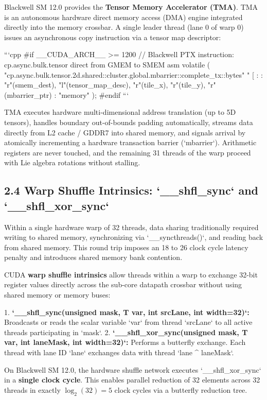 \documentclass[11pt,twoside,openright]{amsbook}
\begin{document}
{{{{{{{Blackwell SM 12.0 provides the \textbf{Tensor Memory Accelerator (TMA)}. TMA is an autonomous hardware direct memory access (DMA) engine integrated directly into the memory crossbar. A single leader thread (lane 0 of warp 0) issues an asynchronous copy instruction via a tensor map descriptor:

```cpp
#if __CUDA_ARCH__ >= 1200
// Blackwell PTX instruction: cp.async.bulk.tensor direct from GMEM to SMEM
asm volatile (
    "cp.async.bulk.tensor.2d.shared::cluster.global.mbarrier::complete_tx::bytes"
    " [%
    :
    : "r"(smem_dest), "l"(tensor_map_desc), "r"(tile_x), "r"(tile_y), "r"(mbarrier_ptr)
    : "memory"
);
#endif
```

TMA executes hardware multi-dimensional address translation (up to 5D tensors), handles boundary out-of-bounds padding automatically, streams data directly from L2 cache / GDDR7 into shared memory, and signals arrival by atomically incrementing a hardware transaction barrier (`mbarrier`). Arithmetic registers are never touched, and the remaining 31 threads of the warp proceed with Lie algebra rotations without stalling.

\subsection{2.4 Warp Shuffle Intrinsics: `__shfl_sync` and `__shfl_xor_sync`}

Within a single hardware warp of 32 threads, data sharing traditionally required writing to shared memory, synchronizing via `__syncthreads()`, and reading back from shared memory. This round trip imposes an 18 to 26 clock cycle latency penalty and introduces shared memory bank contention.

CUDA \textbf{warp shuffle intrinsics} allow threads within a warp to exchange 32-bit register values directly across the sub-core datapath crossbar without using shared memory or memory buses:

1. \textbf{`__shfl_sync(unsigned mask, T var, int srcLane, int width=32)`:} Broadcasts or reads the scalar variable `var` from thread `srcLane` to all active threads participating in `mask`.
2. \textbf{`__shfl_xor_sync(unsigned mask, T var, int laneMask, int width=32)`:} Performs a butterfly exchange. Each thread with lane ID `lane` exchanges data with thread `lane ^ laneMask`.

On Blackwell SM 12.0, the hardware shuffle network executes `__shfl_xor_sync` in a \textbf{single clock cycle}. This enables parallel reduction of 32 elements across 32 threads in exactly $\log_2(32) = 5$ clock cycles via a butterfly reduction tree.

}}}}}}}
\end{document}
